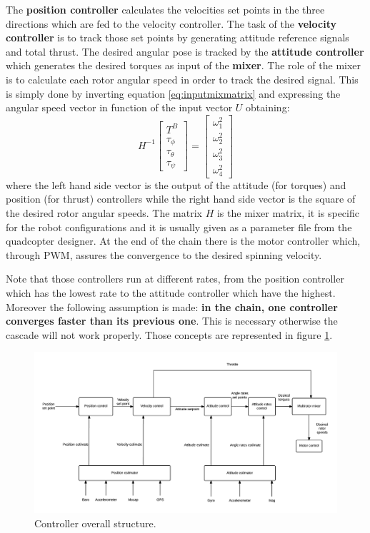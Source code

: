 The \textbf{position controller} calculates the velocities set points in the three directions which are fed to the velocity controller. The task of the \textbf{velocity controller} is to track those set points by generating attitude reference signals and total thrust. The desired angular pose is tracked by the \textbf{attitude controller} which generates the desired torques as input of the \textbf{mixer}. The role of the mixer is to calculate each rotor angular speed in order to track the desired signal. This is simply done by inverting equation \ref{eq:inputmixmatrix} and expressing the angular speed vector in function of the input vector $U$ obtaining:\begin{equation}
H^{-1}\begin{bmatrix}
T^B\\\tau_\phi\\\tau_\theta\\\tau_\psi
\end{bmatrix} = \begin{bmatrix}
\omega_1^2\\\omega_2^2\\\omega_3^2\\\omega_4^2
\end{bmatrix}
\end{equation}
where the left hand side vector is the output of the attitude (for torques) and position (for thrust) controllers while the right hand side vector is the square of the desired rotor angular speeds. The matrix $H$ is the mixer matrix, it is specific for the robot configurations and it is usually given as a parameter file from the quadcopter designer. At the end of the chain there is the motor controller which, through PWM, assures the convergence to the desired spinning velocity. 

Note that those controllers run at different rates, from the position controller which has the lowest rate to the attitude controller which have the highest. Moreover the following assumption is made: \textbf{in the chain, one controller converges faster than its previous one}. This is necessary otherwise the cascade will not work properly. Those concepts are represented in figure \ref{figure:controlarch}.

\begin{figure}[h]
	\centering
	\noindent
	\includegraphics[width=1\textwidth]{control_arch.png}
	\caption{Controller overall structure.}
	\label{figure:controlarch}
\end{figure}


